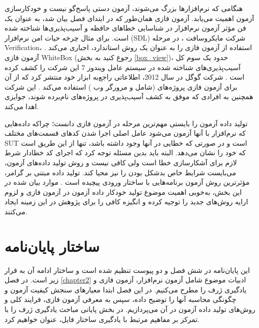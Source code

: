 هنگامی که نرم‌افزارها بزرگ می‌شوند، آزمون دستی پاسخ‌گو نیست و خودکارسازی آزمون اهمیت می‌یابد. آزمون فازی همان‌طور که در ابتدای فصل بیان شد، به عنوان یک فن مؤثر آزمون نرم‌افزار در شناسایی خطاهای حافظه و آسیب‌پذیری‌ها شناخته شده است. برای مثال چرخه حیات امن نرم‌افزار (\gls{SDL}) شرکت مایکروسافت
، در مرحله \gls{Verification}، استفاده از آزمون فازی را به عنوان یک روش استاندارد، اجباری می‌کند \cite{Corporation2010}. آزمون فازی \gls{WhiteBox} (رجوع کنید به بخش \ref{box_view})، حدود یک سوم کل آسیب‌پذیری‌های شناخته شده در سیستم عامل ویندوز 7 این شرکت را کشف کرده است \cite{Godefroid:2012:SWF:2090147.2094081}. شرکت گوگل در سال 2012، اطلاعاتی راجع‌به ابزار  خود منتشر کرد که از آن برای آزمون فازی پروژه‌های  (شامل   و مرورگر وب ) استفاده می‌کند \cite{Kettunen2014}. این شرکت همچنین به افرادی که موفق به کشف آسیب‌پذیری در پروژه‌های‌ نام‌برده شوند، جوایزی اهدا می‌کند.


تولید داده آزمون را بایستی مهم‌ترین مرحله در آزمون فازی دانست؛ چراکه داده‌هایی که نرم‌افزار با آنها آزمون می‌شود عامل اصلی اجرا شدن کد‌های قسمت‌های مختلف \gls{SUT} است و در صورتی که خطایی در آنها وجود داشته باشد، تنها از این طریق است که خود را نشان می‌دهد. البته باید بدین مسئله توجه کرد که اجرای کد خطادار شرط لازم برای آشکارسازی خطا است ولی کافی نیست و روش تولید داده‌های آزمون، می‌بایست شرایط خاص بدشکل بودن را نیز محیا کند. تولید داده مبتنی بر گرامر، مؤثرترین روش آزمون برنامه‌هایی با ساختار ورودی پیچیده است \cite{Chen2018}. موارد بیان شده در این بخش، به‌خوبی اهمیت موضوع تولید خودکار داده آزمون در آزمون فازی و لزوم ارایه روش‌های جدید را توجیه کرده و انگیزه کافی را برای پژوهش در این زمینه ایجاد می‌کنند.   




\section{ساختار پایان‌نامه}

این پایان‌نامه در شش فصل و دو پیوست تنظیم شده است و ساختار ادامه آن به  قرار زیر است. در فصل
\ref{chapter2}
ادبیات موضوع شامل آزمون نرم‌افزار، آزمون ‌فازی و یادگیری ژرف را مطرح می‌کنیم. در این فصل ابتدا معیارهای سنجش کیفیت آزمون و چگونگی محاسبه‌ آنها را توضیح داده، سپس به معرفی آزمون فازی، فرایند کلی  و روش‌های تولید داده آزمون در آن می‌پردازیم. در بخش پایانی مباحث یادگیری ژرف را با تمرکز بر مفاهیم مرتبط با یادگیری ساختار فایل، عنوان خواهیم کرد.  


